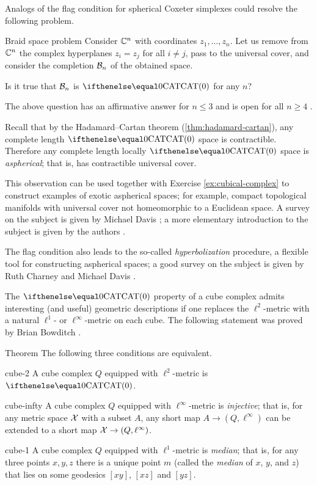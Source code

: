 Analogs of the flag condition for spherical Coxeter simplexes
could resolve the following problem. 

\begin{thm}{Braid space problem}
Consider $\mathbb{C}^n$ with coordinates $z_1,\dots,z_n$.
Let us remove from $\mathbb{C}^n$ the complex hyperplanes $z_i=z_j$ for all $i\ne j$,
pass to the universal cover, and consider the completion $\mathcal{B}_n$ 
of the obtained space.

Is it true that $\mathcal{B}_n$ is $\CAT0$ for any $n$?
\end{thm}

The above question has an affirmative answer for $n\le 3$ and is open for all $n\ge 4$ \cite{charney-davis-1993,panov-petrunin}.

Recall that by the Hadamard--Cartan theorem (\ref{thm:hadamard-cartan}), 
any complete length $\CAT{0}$ space is contractible.
Therefore any complete length locally $\CAT{0}$ space 
is \emph{aspherical};
that is, has contractible universal cover.

This observation can be used together with Exercise \ref{ex:cubical-complex} to construct examples of exotic aspherical spaces;
for example, compact topological manifolds with universal cover not homeomorphic to a Euclidean space.
A survey on the subject is given by Michael Davis \cite{davis-2001}; a more elementary introduction to the subject is given by the authors \cite[Chapter 3]{alexander-kapovitch-petrunin-CAT}.

The flag condition also leads to the so-called {}\emph{hyperbolization} procedure, a flexible tool for constructing  aspherical spaces;
a good survey on the subject is given by Ruth Charney and Michael Davis \cite{charney-davis-1995}.

The $\CAT0$ property of a cube complex admits interesting (and useful) geometric descriptions if one replaces the $\ell^2$-metric with a natural $\ell^1$- or $\ell^\infty$-metric on each cube.
The following statement was proved by Brian Bowditch \cite{bowditch-2020}.

\begin{thm}{Theorem}
The following three conditions are equivalent.

\begin{subthm}{cube-2} A cube complex $Q$ equipped with  $\ell^2$-metric is $\CAT0$.
\end{subthm}

\begin{subthm}{cube-infty} A cube complex $Q$ equipped with $\ell^\infty$-metric is \emph{injective}; that is, for any metric space $\mathcal{X}$ with a subset $A$, any short map $A\to (Q,\ell^\infty)$ can be extended to a short map $\spc{X}\to (Q,\ell^\infty)$.
\end{subthm}

\begin{subthm}{cube-1} A cube complex $Q$ equipped with $\ell^1$-metric is \emph{median}; that is, for any three points $x,y,z$ there is a unique point   $m$ (called the  \emph{median} of $x$, $y$, and $z$) that lies on some geodesics $[xy]$, $[xz]$ and $[yz]$.
\end{subthm}
\end{thm}

